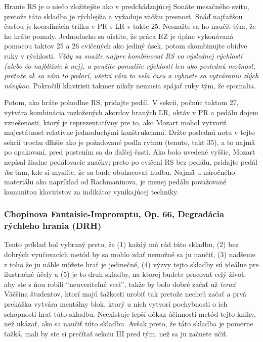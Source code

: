 Hranie RS je o niečo zložitejšie ako v predchádzajúcej Sonáte mesačného svitu, pretože táto skladba je rýchlejšia a vyžaduje väčšiu presnosť. Snáď najťažšou časťou je koordinácia trilku v PR s ĽR v takte 25. Nesnažte sa ho naučiť tým, že ho hráte pomaly. Jednoducho sa uistite, že práca RZ je úplne vykonávaná pomocou taktov 25 a 26 cvičených ako jediný úsek, potom skombinujte obidve ruky v rýchlosti. \emph{Vždy sa snažte najprv kombinovať RS vo výslednej rýchlosti (alebo čo najbližsie k nej), a použite pomalšie rýchlosti len ako poslednú možnosť, pretože ak sa vám to podarí, ušetrí vám to veľa času a vyhnete sa vytváraniu zlých návykov.} Pokročilí klaviristi takmer nikdy nemusia spájať ruky tým, že spomalia.

Potom, ako hráte pohodlne RS, pridajte pedál. V sekcii, počnúc taktom 27, vytvára kombinácia rozložených akordov hraných ĽR, oktáv v PR a pedálu dojem vznešenosti, ktorý je reprezentatívny pre to, ako Mozart mohol vytvoriť majestátnosť relatívne jednoduchými konštrukciami. Držte poslednú notu v tejto sekcii trochu dlhšie ako je požadované podľa rytmu (tenuto, takt 35), a to najmä po opakovaní, pred  pustením sa do ďalšej časti. Ako bolo uvedené vyššie, Mozart nepísal žiadne pedálovacie značky; preto po cvičení RS bez pedálu, pridajte pedál \textit{iba} tam, kde si myslíte, že sa bude obohacovať hudbu. Najmä u náročného materiálu ako napríklad od Rachmaninova, je menej pedálu považované komunitou klaviristov za indikátor vynikajúcej techniky.

\subsubsection{Chopinova Fantaisie-Impromptu, Op. 66, Degradácia rýchleho hrania (DRH)}
Tento príklad bol vybraný preto, že (1) každý má rád túto skladbu, (2) bez dobrých vyučovacích metód by sa mohlo zdať nemožné sa ju naučiť, (3) nadšenie z toho že ju náhle môžete hrať je jedinečné, (4) výzvy tejto skladby sú ideálne pre ilustračné účely a (5) je to druh skladby, na ktorej budete pracovať celý život, aby ste s ňou robili “neuveriteľné veci”, takže by bolo dobré začať už \textit{teraz}! Väčšina študentov, ktorí majú ťažkosti urobiť tak pretože nechcú začať a prvá prekážka vytvára mentálny blok, ktorý u nich vytvorí pochybnosti o ich schopnosti hrať túto skladbu. Neexistuje lepší dôkaz účinnosti metód tejto knihy, než ukázať, ako sa naučiť túto skladbu. Avšak preto, že táto skladba je pomerne ťažká, mali by ste si prečítať sekciu III pred tým, než sa ju začnete učiť.

